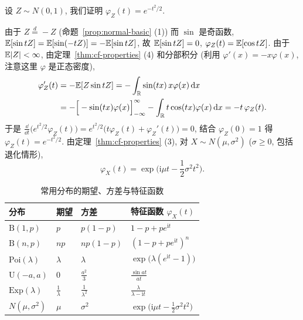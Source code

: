 \begin{example}[正态分布的特征函数]\label{ex:normal-cf}
设 $Z\sim N(0,1)$, 我们证明 $\varphi_Z(t)=e^{-t^2/2}$.

由于 $Z\overset{d}{=}-Z$ (命题~\ref{prop:normal-basic} (1)) 而 $\sin$ 是奇函数, $\mathbb{E}[\sin tZ]=\mathbb{E}[\sin(-tZ)]=-\mathbb{E}[\sin tZ]$, 故 $\mathbb{E}[\sin tZ]=0$, $\varphi_Z(t)=\mathbb{E}[\cos tZ]$. 由于 $\mathbb{E}\lvert Z\rvert<\infty$, 由定理~\ref{thm:cf-properties} (4) 和分部积分 (利用 $\varphi'(x)=-x\varphi(x)$, 注意这里 $\varphi$ 是正态密度),
\begin{align*}
\varphi_Z'(t)&=-\mathbb{E}[Z\sin tZ]=-\int_{\mathbb{R}}\sin(tx)\,x\varphi(x)\mathop{}\!\mathrm{d} x\\
&=-\Big[-\sin(tx)\varphi(x)\Big]_{-\infty}^{\infty}-\int_{\mathbb{R}}t\cos(tx)\varphi(x)\mathop{}\!\mathrm{d} x=-t\,\varphi_Z(t).
\end{align*}
于是 $\frac{\dd}{\dd t}\big(e^{t^2/2}\varphi_Z(t)\big)=e^{t^2/2}\big(t\varphi_Z(t)+\varphi_Z'(t)\big)=0$, 结合 $\varphi_Z(0)=1$ 得 $\varphi_Z(t)=e^{-t^2/2}$. 由定理~\ref{thm:cf-properties} (3), 对 $X\sim N(\mu,\sigma^2)$ ($\sigma\ge0$, 包括退化情形),
\begin{equation}\label{eq:normal-cf}
\varphi_X(t)=\exp\Big(\mathrm{i}\mu t-\frac{1}{2}\sigma^2t^2\Big).
\end{equation}
\end{example}

\begin{table}[htbp]
\centering
\caption{常用分布的期望、方差与特征函数}
\label{tab:cf}
\renewcommand{\arraystretch}{1.6}
\begin{tabular}{llll}
\toprule
分布 & 期望 & 方差 & 特征函数 $\varphi_X(t)$ \\
\midrule
$\mathrm{B}(1,p)$ & $p$ & $p(1-p)$ & $1-p+pe^{\mathrm{i}t}$ \\
$\mathrm{B}(n,p)$ & $np$ & $np(1-p)$ & $(1-p+pe^{\mathrm{i}t})^n$ \\
$\mathrm{Poi}(\lambda)$ & $\lambda$ & $\lambda$ & $\exp\big(\lambda(e^{\mathrm{i}t}-1)\big)$ \\
$\mathrm{U}(-a,a)$ & $0$ & $\frac{a^2}{3}$ & $\frac{\sin at}{at}$ \\
$\mathrm{Exp}(\lambda)$ & $\frac{1}{\lambda}$ & $\frac{1}{\lambda^2}$ & $\frac{\lambda}{\lambda-\mathrm{i}t}$ \\
$N(\mu,\sigma^2)$ & $\mu$ & $\sigma^2$ & $\exp\big(\mathrm{i}\mu t-\frac{1}{2}\sigma^2t^2\big)$ \\
\bottomrule
\end{tabular}
\end{table}

